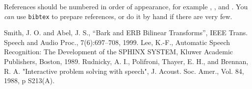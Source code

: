\documentclass[10pt,a4paper,oneclumn]{article}
\begin{document}
References should be numbered in order of appearance, 
for example \cite{ES1}, \cite{ES2}, and \cite{ES3}. 
You \emph{can} use \texttt{bibtex} to prepare references,
or do it by hand if there are very few.

%

\begin{thebibliography}{10}
 Smith, J. O. and Abel, J. S., 
``Bark and {ERB} Bilinear Transforms'', 
IEEE Trans. Speech and Audio Proc., 7(6):697--708, 1999.  
 Lee, K.-F., Automatic Speech Recognition: 
The Development of the 
SPHINX SYSTEM, Kluwer Academic Publishers, Boston, 1989.
 Rudnicky, A. I., Polifroni, Thayer, E. H.,
 and Brennan, R. A.  
"Interactive problem solving with speech", J. Acoust. Soc. Amer., 
Vol. 84, 1988, p S213(A).
\end{thebibliography}
\end{document}
